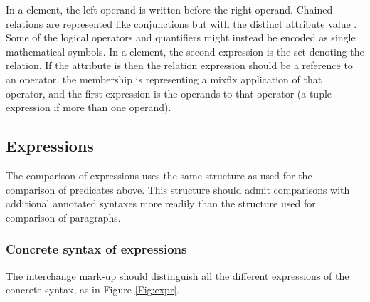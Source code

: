 \documentclass[a4paper,10pt]{article}
\begin{document}
In a  element,
the left operand is written before the right operand.
Chained relations are represented like conjunctions
but with the distinct  attribute value .
Some of the logical operators and quantifiers might instead
be encoded as single mathematical symbols.
In a  element,
the second expression is the set denoting the relation.
If the  attribute is 
then the relation expression should be a reference to an operator,
the membership is representing a mixfix application of that operator,
and the first expression is the operands to that operator
(a tuple expression if more than one operand).

\subsection{Expressions}

The comparison of expressions uses the same structure as used
for the comparison of predicates above.
This structure should admit comparisons with additional annotated syntaxes
more readily than the structure used for comparison of paragraphs.

\subsubsection{Concrete syntax of expressions}

The interchange mark-up should distinguish all the different expressions
of the concrete syntax, as in Figure \ref{Fig:expr}.
\end{document}
